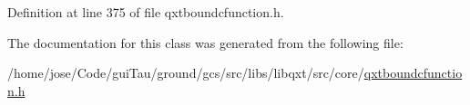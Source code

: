 Definition at line 375 of file qxtboundcfunction.\-h.



The documentation for this class was generated from the following file\-:\begin{DoxyCompactItemize}
\item 
/home/jose/\-Code/gui\-Tau/ground/gcs/src/libs/libqxt/src/core/\hyperlink{qxtboundcfunction_8h}{qxtboundcfunction.\-h}\end{DoxyCompactItemize}
